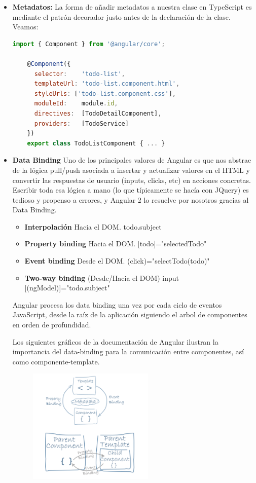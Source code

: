 \begin{itemize}
\item \textbf{Metadatos:} La forma de añadir metadatos a nuestra clase en TypeScript es mediante el patrón decorador justo antes de la declaración de la clase. Veamos:
\begin{lstlisting}[language=javascript] 
   import { Component } from '@angular/core';

    @Component({
      selector:    'todo-list',
      templateUrl: 'todo-list.component.html',
      styleUrls: ['todo-list.component.css'],
      moduleId:    module.id,  
      directives:  [TodoDetailComponent],
      providers:   [TodoService]
    })
    export class TodoListComponent { ... }
\end{lstlisting}


\item \textbf{Data Binding} Uno de los principales valores de Angular es que nos abstrae de la lógica pull/push asociada a insertar y actualizar valores en el HTML y convertir las respuestas de usuario (inputs, clicks, etc) en acciones concretas. Escribir toda esa lógica a mano (lo que típicamente se hacía con JQuery) es tedioso y propenso a errores, y Angular 2 lo resuelve por nosotros gracias al Data Binding.
\begin{itemize}
\item \textbf{Interpolación} Hacia el DOM.
{{todo.subject}}
\item \textbf{Property binding} Hacia el DOM. 
[todo]="selectedTodo"
\item \textbf{Event binding} Desde el DOM. (click)="selectTodo(todo)"

\item \textbf{Two-way binding} (Desde/Hacia el DOM) input [(ngModel)]="todo.subject"
\end{itemize}

Angular procesa los data binding una vez por cada ciclo de eventos JavaScript, desde la raíz de la aplicación siguiendo el arbol de componentes en orden de profundidad.

Los siguientes gráficos de la documentación de Angular ilustran la importancia del data-binding para la comunicación entre componentes, así como componente-template.

\begin{figure}[H]
    \centering
    \includegraphics[width=60mm]{memoria/LaTeX/img/infraestructura/databinding.png}
\end{figure}



\end{itemize}
